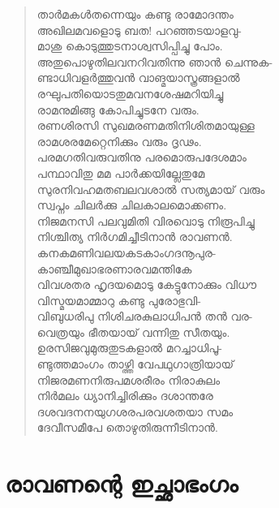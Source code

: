\begin{verse}
താര്‍മകള്‍തന്നെയും കണ്ടു രാമോദന്തം\\
അഖിലമവളൊടു ബത! പറഞ്ഞടയാളവു-\\
മാശു കൊടുത്തുടനാശ്വസിപ്പിച്ചു പോം.\\
അതുപൊഴുതിലവനറിവതിന്നു ഞാന്‍ ചെന്നുക-\\
ണ്ടാധിവളര്‍ത്തുവന്‍ വാങ്മയാസ്ത്രങ്ങളാല്‍\\
രഘുപതിയൊടതുമവനശേഷമറിയിച്ചു\\
രാമനുമിങ്ങു കോപിച്ചുടനേ വരും.\\
രണശിരസി സുഖമരണമതിനിശിതമായുള്ള\\
രാമശരമേറ്റെനിക്കും വരും ദൃഢം.\\
പരമഗതിവരുവതിനു പരമൊരുപദേശമാം\\
പന്ഥാവിതു മമ പാര്‍ക്കയില്ലേതുമേ\\
സുരനിവഹമതബലവശാല്‍ സത്യമായ് വരും\\
സ്വപ്നം ചിലര്‍ക്കു ചിലകാലമൊക്കണം.\\
നിജമനസി പലവുമിതി വിരവൊടു നിരൂപിച്ചു\\
നിശ്ചിത്യ നിര്‍ഗമിച്ചീടിനാന്‍ രാവണന്‍.\\
കനകമണിവലയകടകാംഗദനൂപുര-\\
കാഞ്ചീമുഖാഭരണാരവമന്തികേ\\
വിവശതര ഹൃദയമൊടു കേട്ടുനോക്കും വിധൗ\\
വിസ്മയമാമ്മാറു കണ്ടു പുരോഭുവി-\\
വിബുധരിപു നിശിചരകുലാധിപന്‍ തന്‍ വര-\\
വെത്രയും ഭീതയായ് വന്നിതു സീതയും.\\
ഉരസിജവുമുരുതുടകളാല്‍ മറച്ചാധിപൂ-\\
ണ്ടുത്തമാംഗം താഴ്ത്തി വേപഥുഗാത്രിയായ്\\
നിജരമണനിരുപമശരീരം നിരാകുലം\\
നിര്‍മലം ധ്യാനിച്ചിരിക്കും ദശാന്തരേ\\
ദശവദനനയുഗശരപരവശതയാ സമം\\
ദേവീസമീപേ തൊഴുതിരുന്നീടിനാന്‍.
\end{verse}


\section{രാവണന്റെ ഇച്ഛാഭംഗം}

